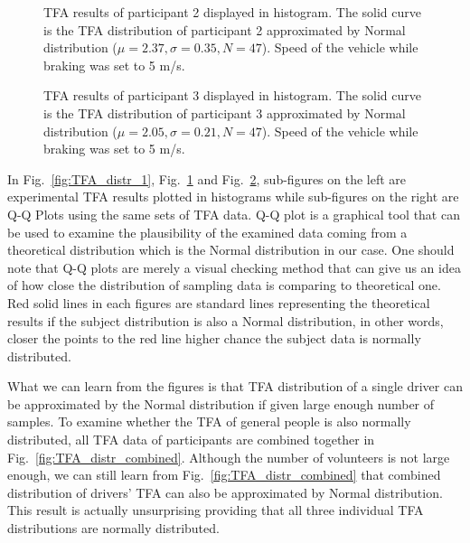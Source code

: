 \begin{figure}[htbp!]
\begin{center}
\end{center}
\caption{TFA results of participant 2 displayed in histogram. The solid curve is the TFA distribution of participant 2 approximated by Normal distribution ($\mu = 2.37, \sigma = 0.35, N = 47$). Speed of the vehicle while braking was set to 5 m/s.}
\label{fig:TFA_distr_2} 
\end{figure}

\begin{figure}[htbp!]
\begin{center}
\end{center}
\caption{TFA results of participant 3 displayed in histogram. The solid curve is the TFA distribution of participant 3 approximated by Normal distribution ($\mu = 2.05, \sigma = 0.21, N = 47$). Speed of the vehicle while braking was set to 5 m/s.}
\label{fig:TFA_distr_3} 
\end{figure}

In Fig.~\ref{fig:TFA_distr_1}, Fig.~\ref{fig:TFA_distr_2} and Fig.~\ref{fig:TFA_distr_3}, sub-figures on the left are experimental TFA results plotted in histograms while sub-figures on the right are \ac{Q-Q Plots} using the same sets of TFA data. Q-Q plot is a graphical tool that can be used to examine the plausibility of the examined data coming from a theoretical distribution which is the Normal distribution in our case. One should note that Q-Q plots are merely a visual checking method that can give us an idea of how close the distribution of sampling data is comparing to theoretical one. Red solid lines in each figures are standard lines representing the theoretical results if the subject distribution is also a Normal distribution, in other words, closer the points to the red line higher chance the subject data is normally distributed.  

What we can learn from the figures is that TFA distribution of a single driver can be approximated by the Normal distribution if given large enough number of samples. To examine whether the TFA of general people is also normally distributed, all TFA data of participants are combined together in Fig.~\ref{fig:TFA_distr_combined}. Although the number of volunteers is not large enough, we can still learn from Fig.~\ref{fig:TFA_distr_combined} that combined distribution of drivers' TFA can also be approximated by Normal distribution. This result is actually unsurprising providing that all three individual TFA distributions are normally distributed.

